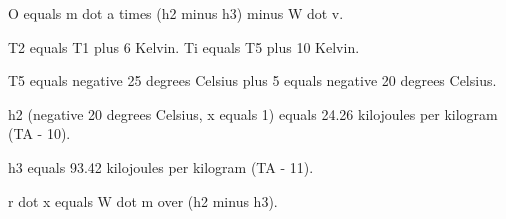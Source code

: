 O equals m dot a times (h2 minus h3) minus W dot v.

T2 equals T1 plus 6 Kelvin. Ti equals T5 plus 10 Kelvin.

T5 equals negative 25 degrees Celsius plus 5 equals negative 20 degrees Celsius.

h2 (negative 20 degrees Celsius, x equals 1) equals 24.26 kilojoules per kilogram (TA - 10).

h3 equals 93.42 kilojoules per kilogram (TA - 11).

r dot x equals W dot m over (h2 minus h3).
